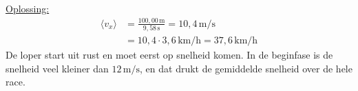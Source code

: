 \documentclass{ximera}
\begin{document}
\begin{exercise}
\begin{question}
\begin{solution}
            \underline{Oplossing:}\\
            \begin{align*}
                \langle v_x \rangle &= \frac{100{,}00 \, \mathrm{m}}{9{,}58 \, \mathrm{s}} = \boxed{10{,}4 \, \mathrm{m/s}}\\
                &= 10{,}4 \cdot 3{,}6 \, \mathrm{km/h} = \boxed{37{,}6 \, \mathrm{km/h}}
            \end{align*}
            De loper start uit rust en moet eerst op snelheid komen. In de beginfase is de snelheid veel kleiner dan $12 \, \mathrm{m/s}$, en dat drukt de gemiddelde snelheid over de hele race.
        \end{solution}
    \end{question}
\end{exercise}
\end{document}
